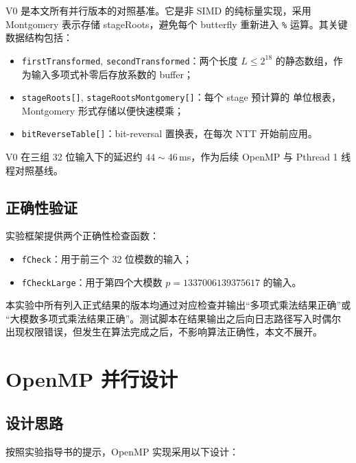 \documentclass[UTF8,a4paper,10pt]{ctexart}
\begin{document}
V0 是本文所有并行版本的对照基准。它是非 SIMD 的纯标量实现，采用 Montgomery 表示存储
stageRoots，避免每个 butterfly 重新进入 \texttt{\%} 运算。其关键数据结构包括：

\begin{itemize}
  \item \texttt{firstTransformed}, \texttt{secondTransformed}：两个长度 $L \le 2^{18}$
        的静态数组，作为输入多项式补零后存放系数的 buffer；
  \item \texttt{stageRoots[]}, \texttt{stageRootsMontgomery[]}：每个 stage 预计算的
        单位根表，Montgomery 形式存储以便快速模乘；
  \item \texttt{bitReverseTable[]}：bit-reversal 置换表，在每次 NTT 开始前应用。
\end{itemize}

V0 在三组 32 位输入下的延迟约 $44\sim46$\,ms，作为后续 OpenMP 与 Pthread 1 线程对照基线。

\subsection{正确性验证}

实验框架提供两个正确性检查函数：

\begin{itemize}
  \item \texttt{fCheck}：用于前三个 32 位模数的输入；
  \item \texttt{fCheckLarge}：用于第四个大模数 $p = 1337006139375617$ 的输入。
\end{itemize}

本实验中所有列入正式结果的版本均通过对应检查并输出``多项式乘法结果正确''或
``大模数多项式乘法结果正确''。测试脚本在结果输出之后向日志路径写入时偶尔
出现权限错误，但发生在算法完成之后，不影响算法正确性，本文不展开。

\section{OpenMP 并行设计}

\subsection{设计思路}

按照实验指导书的提示，OpenMP 实现采用以下设计：
\end{document}
